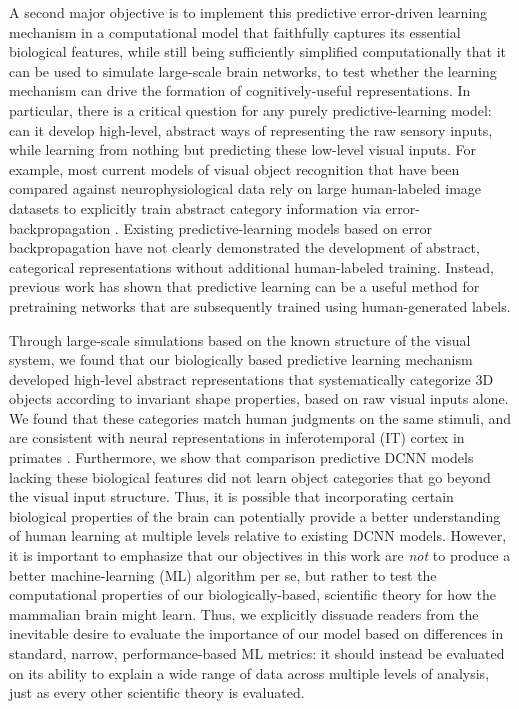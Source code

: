 \documentclass[11pt,twoside]{article}
\newif\myifpdf
\begin{document}
A second major objective is to implement this predictive error-driven learning mechanism in a computational model that faithfully captures its essential biological features, while still being sufficiently simplified computationally that it can be used to simulate large-scale brain networks, to test whether the learning mechanism can drive the formation of cognitively-useful representations.  In particular, there is a critical question for any purely predictive-learning model: can it develop high-level, abstract ways of representing the raw sensory inputs, while learning from nothing but predicting these low-level visual inputs.  For example, most current models of visual object recognition that have been compared against neurophysiological data rely on large human-labeled image datasets to explicitly train abstract category information via error-backpropagation \cite{CadieuHongYaminsEtAl14,RajalinghamIssaBashivanEtAl18}.  Existing predictive-learning models based on error backpropagation \cite{LotterKreimanCox16} have not clearly demonstrated the development of abstract, categorical representations without additional human-labeled training.  Instead, previous work has shown that predictive learning can be a useful method for pretraining networks that are subsequently trained using human-generated labels.

Through large-scale simulations based on the known structure of the visual system, we found that our biologically based predictive learning mechanism developed high-level abstract representations that systematically categorize 3D objects according to invariant shape properties, based on raw visual inputs alone.  We found that these categories match human judgments on the same stimuli, and are consistent with neural representations in inferotemporal (IT) cortex in primates \cite{CadieuHongYaminsEtAl14}.  Furthermore, we show that comparison predictive DCNN models lacking these biological features \cite{LotterKreimanCox16} did not learn object categories that go beyond the visual input structure.  Thus, it is possible that incorporating certain biological properties of the brain can potentially provide a better understanding of human learning at multiple levels relative to existing DCNN models.  However, it is important to emphasize that our objectives in this work are \emph{not} to produce a better machine-learning (ML) algorithm per se, but rather to test the computational properties of our biologically-based, scientific theory for how the mammalian brain might learn.  Thus, we explicitly dissuade readers from the inevitable desire to evaluate the importance of our model based on differences in standard, narrow, performance-based ML metrics: it should instead be evaluated on its ability to explain a wide range of data across multiple levels of analysis, just as every other scientific theory is evaluated.
\end{document}
